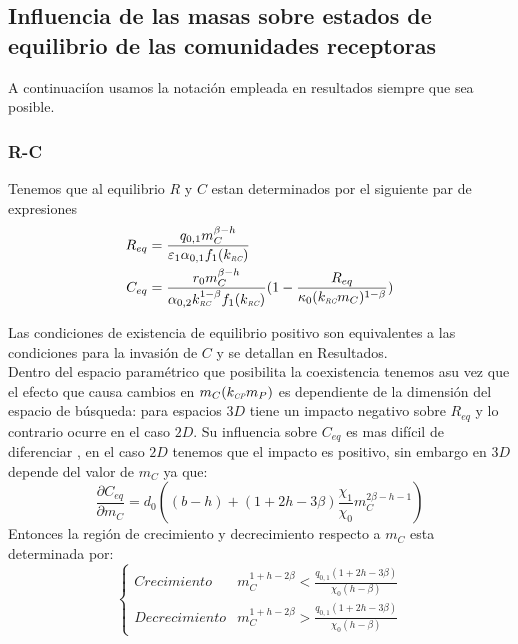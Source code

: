 \subsection{Influencia de las masas sobre estados de equilibrio de las comunidades receptoras}

A continuaci\'ion usamos la notaci\'on empleada en resultados siempre que sea posible.
\subsubsection{R-C}
Tenemos que al equilibrio $R$ y $C$ estan determinados por el siguiente par de expresiones
\begin{equation}
  \begin{aligned}
    R_{eq} &= \frac{q_{0,1} m_C^{\beta-h}}{\varepsilon_1 \alpha_{0,1} f_1(k_{\textit{\tiny RC}})}\\
    C_{eq} &= \frac{r_0 m_C^{\beta -h}}{\alpha_{0,2} k_{\textit{\tiny RC}}^{1 - \beta}f_1(k_{\textit{\tiny RC}})}(1 - \frac{R_{eq}}{\kappa_0 (k_{\textit{\tiny RC}} m_C)^{1-\beta}})
  \end{aligned}
\end{equation}

Las condiciones de existencia de equilibrio positivo son equivalentes a las condiciones para la invasi\'on de $C$ y se detallan en Resultados.\\
Dentro del espacio param\'etrico que posibilita la coexistencia tenemos asu vez que el efecto que causa cambios en $m_C(k_{\textit{\tiny CP}} m_P)$ es dependiente de la dimensi\'on del espacio de b\'usqueda: para espacios $3D$ tiene un impacto negativo sobre $R_{eq}$ y lo contrario ocurre en el caso $2D$. Su influencia sobre $C_{eq}$ es mas dif\'icil de diferenciar , en el caso $2D$ tenemos que el impacto es positivo, sin embargo en $3D$ depende del valor de $m_C$ ya que:
\begin{equation}
  \frac{\partial C_{eq}}{\partial m_C}  = d_0 ( (b-h) + (1 + 2h - 3 \beta )\frac{\chi_1}{\chi_0} m_C^{2\beta -h -1}) 
\end{equation}
Entonces la regi\'on de crecimiento y decrecimiento respecto a $m_C$ esta determinada por:
\begin{equation}
  \begin{cases}
    Crecimiento &  m_C^{1 + h - 2\beta} < \frac{q_{0,1}(1+2h -3 \beta)}{\chi_0(h - \beta)}\\
    Decrecimiento &  m_C^{1 + h - 2\beta} > \frac{q_{0,1}(1+2h -3 \beta)}{\chi_0(h - \beta)}
  \end{cases}
\end{equation}

